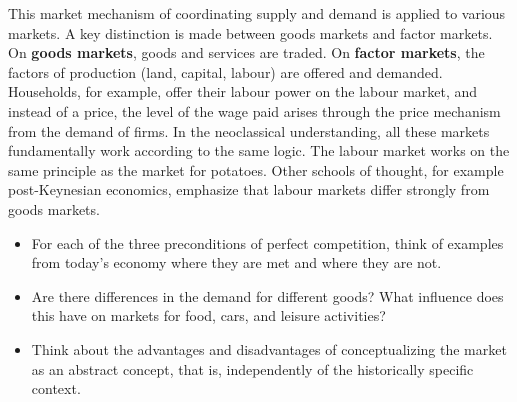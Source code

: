 \documentclass[
  british,
  a4paper,
  DIV=11,
  numbers=noendperiod,
  oneside,
  openany]{scrreprt}
\providecommand{\tightlist}{%
  \setlength{\itemsep}{0pt}\setlength{\parskip}{0pt}}
\begin{document}
This market mechanism of coordinating supply and demand is applied to
various markets. A key distinction is made between goods markets and
factor markets. On \textbf{goods markets}, goods and services are
traded. On \textbf{factor markets}, the factors of production (land,
capital, labour) are offered and demanded. Households, for example,
offer their labour power on the labour market, and instead of a price,
the level of the wage paid arises through the price mechanism from the
demand of firms. In the neoclassical understanding, all these markets
fundamentally work according to the same logic. The labour market works
on the same principle as the market for potatoes. Other schools of
thought, for example post-Keynesian economics, emphasize that labour
markets differ strongly from goods markets.

\begin{tcolorbox}[enhanced jigsaw, arc=.35mm, bottomrule=.15mm, bottomtitle=1mm, breakable, colback=white, colbacktitle=quarto-callout-caution-color!10!white, colframe=quarto-callout-caution-color-frame, coltitle=black, left=2mm, leftrule=.75mm, opacityback=0, opacitybacktitle=0.6, rightrule=.15mm, title={In-depth questions}, titlerule=0mm, toprule=.15mm, toptitle=1mm]

\begin{itemize}
\tightlist
\item
  For each of the three preconditions of perfect competition, think of
  examples from today's economy where they are met and where they are
  not.
\item
  Are there differences in the demand for different goods? What
  influence does this have on markets for food, cars, and leisure
  activities?
\item
  Think about the advantages and disadvantages of conceptualizing the
  market as an abstract concept, that is, independently of the
  historically specific context.
\end{itemize}

\end{tcolorbox}
\end{document}
